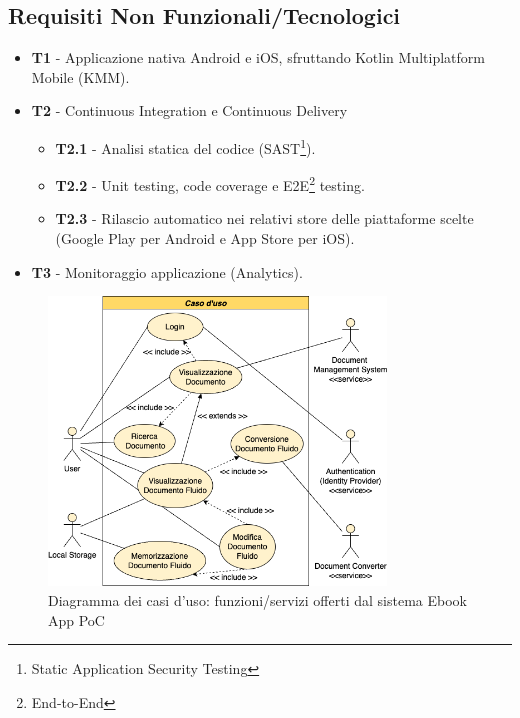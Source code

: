 \subsection{Requisiti Non Funzionali/Tecnologici}
\begin{itemize}
    \item \textbf{T1} - Applicazione nativa Android e iOS, sfruttando Kotlin Multiplatform Mobile (KMM).
    \item \textbf{T2} - Continuous Integration e Continuous Delivery
    \begin{itemize}
        \item \textbf{T2.1} - Analisi statica del codice (SAST\footnote{Static Application Security Testing}).
        \item \textbf{T2.2} - Unit testing, code coverage e E2E\footnote{End-to-End} testing.
        \item \textbf{T2.3} - Rilascio automatico nei relativi store delle piattaforme scelte (Google Play per Android e App Store per iOS).
    \end{itemize}
    \item \textbf{T3} - Monitoraggio applicazione (Analytics).
\end{itemize}

\begin{figure}[H]
\centering
\includegraphics[width=0.8\textwidth]{img/tesi-1-Use-case.drawio.png}
\caption{Diagramma dei casi d'uso: funzioni/servizi offerti dal sistema Ebook App PoC}
\end{figure}



